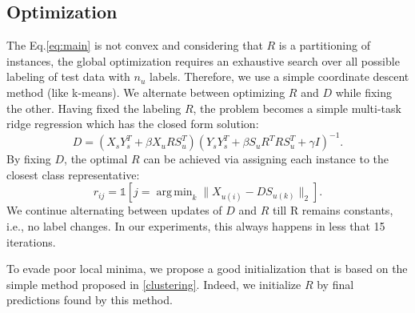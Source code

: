 \documentclass[10pt,twocolumn,letterpaper]{article}
\DeclareMathOperator*{\argmin}{arg\,min}
\begin{document}
\subsection{Optimization}
The Eq.\eqref{eq:main} is not convex and considering that $R$ is a partitioning of instances, the global optimization requires an
exhaustive search over all possible labeling of test data with $n_u$ labels. Therefore, we use a simple coordinate descent
method (like k-means). We alternate between optimizing $R$ and $D$ while fixing the other.
Having fixed the labeling $R$, the problem becomes a simple multi-task ridge regression which has the closed form solution:
\begin{equation} \label{eq:d_update}
  D = (X_s Y_s^T + \beta X_u R S_u^T) (Y_s Y_s^T + \beta S_u R^T R S_u^T  + \gamma I)^{-1}.
\end{equation}
By fixing $D$, the optimal $R$ can be achieved via assigning each instance to the closest class representative:
\begin{equation} \label{eq:r_update}
  r_{ij} = \mathds{1}[j = \argmin_{k} \lVert X_{u(i)} - D S_{u(k)} \rVert_2 ].
\end{equation}
We continue alternating between updates of $D$ and $R$ till R remains constants, i.e., no label changes. In our experiments, this always happens
in less that 15 iterations.

To evade poor local minima, we propose a good initialization that is based on the simple method proposed in \ref{clustering}. Indeed, we initialize  $R$ by final predictions found by this method.
\end{document}
